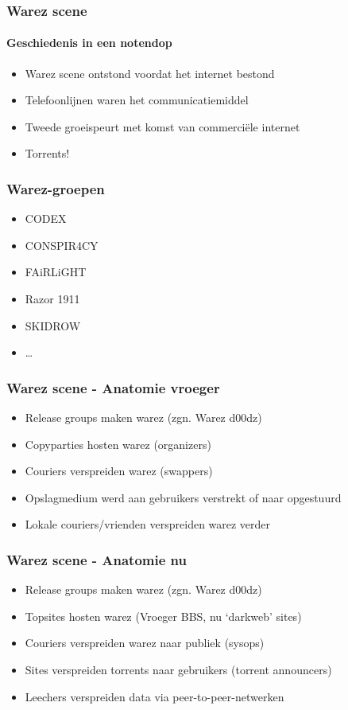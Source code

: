 \documentclass{beamer}
\begin{document}
\begin{frame}
	\frametitle{Warez scene}
	\framesubtitle{Geschiedenis in een notendop}

	\begin{itemize}
		\item Warez scene ontstond voordat het internet bestond
		\item Telefoonlijnen waren het communicatiemiddel
		\item Tweede groeispeurt met komst van commerci\"ele internet
		\item Torrents!
	\end{itemize}
\end{frame}

\begin{frame}
	\frametitle{Warez-groepen}

	\begin{itemize}
		\item CODEX
		\item CONSPIR4CY
		\item FAiRLiGHT
		\item Razor 1911
		\item SKIDROW
		\item \dots
	\end{itemize}
\end{frame}

\begin{frame}
	\frametitle{Warez scene - Anatomie vroeger}

	\begin{itemize}
		\item Release groups maken warez (zgn. Warez d00dz)
		\item Copyparties hosten warez (organizers)
		\item Couriers verspreiden warez (swappers)
		\item Opslagmedium werd aan gebruikers verstrekt of naar opgestuurd
		\item Lokale couriers/vrienden verspreiden warez verder
	\end{itemize}
\end{frame}

\begin{frame}
	\frametitle{Warez scene - Anatomie nu}

	\begin{itemize}
		\item Release groups maken warez (zgn. Warez d00dz)
		\item Topsites hosten warez (Vroeger BBS, nu `darkweb' sites)
		\item Couriers verspreiden warez naar publiek (sysops)
		\item Sites verspreiden torrents naar gebruikers (torrent announcers)
		\item Leechers verspreiden data via peer-to-peer-netwerken
	\end{itemize}
\end{frame}
\end{document}
